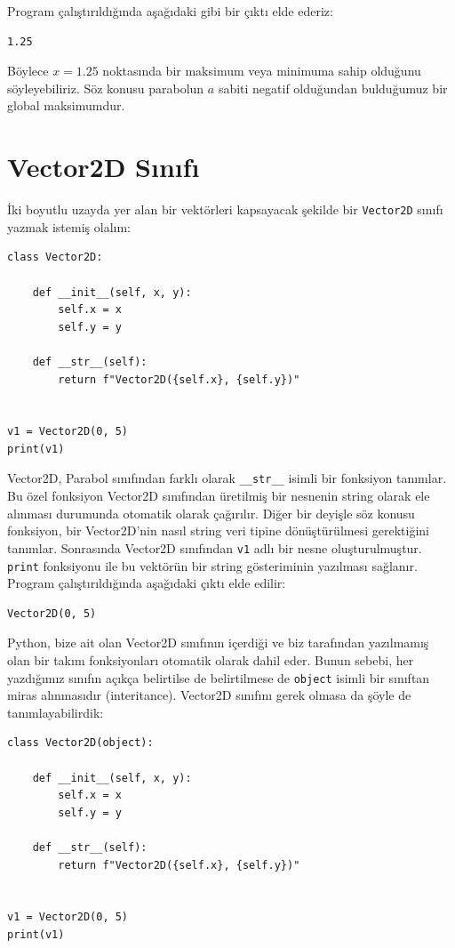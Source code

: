 \documentclass[12pt]{report}
\begin{document}
Program çalıştırıldığında aşağıdaki gibi bir çıktı elde ederiz:


\begin{Verbatim}[frame = single]
1.25
\end{Verbatim}

Böylece $x = 1.25$ noktasında bir maksimum veya minimuma sahip olduğunu söyleyebiliriz. Söz konusu parabolun $a$ sabiti negatif olduğundan bulduğumuz bir global maksimumdur. 


\pagebreak
\section{Vector2D Sınıfı}
İki  boyutlu uzayda yer alan bir vektörleri kapsayacak şekilde bir \texttt{Vector2D} sınıfı yazmak istemiş olalım:


\begin{Verbatim}[frame = single]
class Vector2D:

	def __init__(self, x, y):
		self.x = x
		self.y = y
	
	def __str__(self):
		return f"Vector2D({self.x}, {self.y})"


v1 = Vector2D(0, 5)
print(v1)
\end{Verbatim}


Vector2D, Parabol sınıfından farklı olarak \texttt{\_\_str\_\_} isimli bir fonksiyon tanımlar. Bu özel fonksiyon Vector2D sınıfından üretilmiş bir nesnenin string olarak ele alınması durumunda otomatik olarak çağırılır. Diğer bir deyişle söz konusu fonksiyon, bir Vector2D'nin nasıl string veri tipine dönüştürülmesi gerektiğini tanımlar. Sonrasında Vector2D sınıfından \texttt{v1} adlı bir nesne oluşturulmuştur. \texttt{print} fonksiyonu ile bu vektörün bir string gösteriminin yazılması sağlanır. Program çalıştırıldığında aşağıdaki çıktı elde edilir:


\begin{Verbatim}[frame = single]
Vector2D(0, 5)
\end{Verbatim}

Python, bize ait olan Vector2D sınıfının içerdiği ve biz tarafından yazılmamış olan bir takım fonksiyonları otomatik olarak dahil eder. Bunun sebebi, her yazdığımız sınıfın açıkça belirtilse de belirtilmese de \texttt{object} isimli bir sınıftan miras alınmasıdır (interitance). Vector2D sınıfını gerek olmasa da şöyle de tanımlayabilirdik:

\begin{Verbatim}[frame = single]
class Vector2D(object):

	def __init__(self, x, y):
		self.x = x
		self.y = y
	
	def __str__(self):
		return f"Vector2D({self.x}, {self.y})"


v1 = Vector2D(0, 5)
print(v1)
\end{Verbatim}
\end{document}
